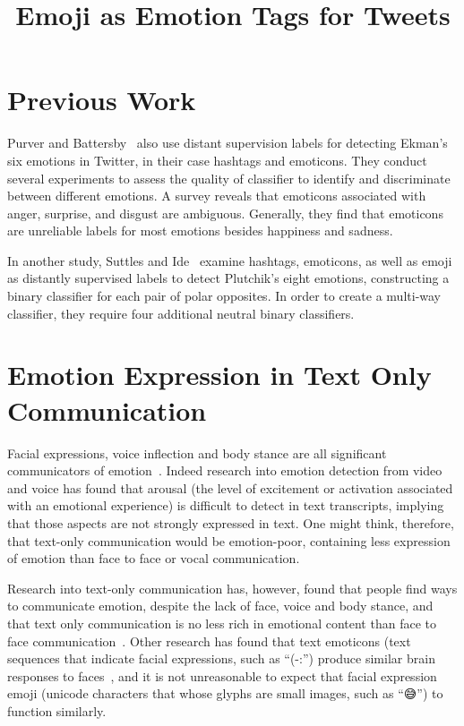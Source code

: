\documentclass[10pt, a4paper]{article}
\title{Emoji as Emotion Tags for Tweets}
\begin{document}
\maketitleabstract

\section{Previous Work}
Purver and Battersby~ also use distant supervision labels for detecting Ekman’s six emotions in Twitter, in their case hashtags and emoticons. They conduct several experiments to assess the quality of classifier to identify and discriminate between different emotions. A survey reveals that emoticons associated with anger, surprise, and disgust are ambiguous. Generally, they find that emoticons are unreliable labels for most emotions besides happiness and sadness.

In another study, Suttles and Ide~ examine hashtags, emoticons, as well as emoji as distantly supervised labels to detect Plutchik’s eight emotions, constructing a binary classifier for each pair of polar opposites. In order to create a multi-way classifier, they require four additional neutral binary classifiers. 

\section{Emotion Expression in Text Only Communication}
\label{sec:emotion_expression_in_text_only_communication}
Facial expressions, voice inflection and body stance are all significant communicators of emotion~\cite{Johnston2015Apa}. 
Indeed research into emotion detection from video and voice has found that arousal (the level of excitement or activation associated with an emotional experience) is 
difficult to detect in text transcripts, implying that those aspects are not strongly expressed in text.
One might think, therefore, that text-only communication would be emotion-poor, containing less expression of emotion than face to face or vocal communication.

Research into text-only communication has, however, found that people find ways to communicate emotion, despite the lack of face, voice and body stance, and that text only communication is no less rich in emotional content than face to face communication~\cite{Derks2008Role}.
Other research has found that text emoticons (text sequences that indicate facial expressions, such as ``(-:'') produce similar brain responses to faces~\cite{Churches2014Emoticons}, and it is not unreasonable to expect that facial expression emoji (unicode characters that whose glyphs are small images, such as ``😅'') to function similarly.
\end{document}
